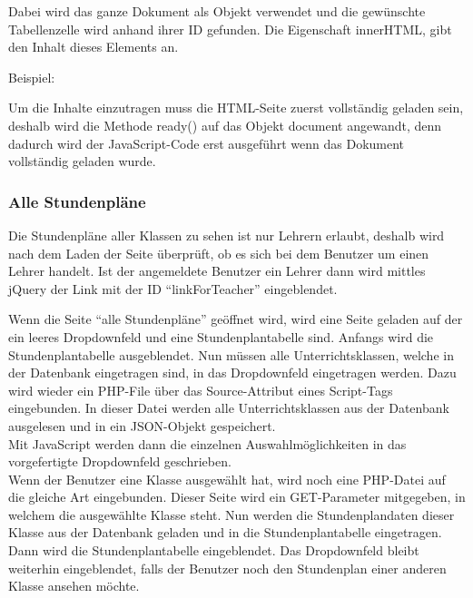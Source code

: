 Dabei wird das ganze Dokument als Objekt verwendet und die gewünschte Tabellenzelle wird anhand ihrer ID gefunden. Die Eigenschaft innerHTML, gibt den Inhalt dieses Elements an.

Beispiel:

	


Um die Inhalte einzutragen muss die HTML-Seite zuerst vollständig geladen sein, deshalb wird die Methode ready() auf das Objekt document angewandt, denn dadurch wird der JavaScript-Code erst ausgeführt wenn das Dokument vollständig geladen wurde.

\subsubsection{Alle Stundenpläne}

Die Stundenpläne aller Klassen zu sehen ist nur Lehrern erlaubt, deshalb wird nach  dem Laden der Seite überprüft, ob es sich bei dem Benutzer um einen Lehrer handelt. Ist der angemeldete Benutzer ein Lehrer dann wird mittles jQuery der Link mit der ID \enquote{linkForTeacher} eingeblendet.\\

\newpage


Wenn die Seite \enquote{alle Stundenpläne} geöffnet wird, wird eine Seite geladen auf der ein leeres Dropdownfeld und eine Stundenplantabelle sind. Anfangs wird die Stundenplantabelle ausgeblendet. Nun müssen alle Unterrichtsklassen, welche in der Datenbank eingetragen sind, in das Dropdownfeld eingetragen werden. Dazu wird wieder ein PHP-File über das Source-Attribut eines Script-Tags eingebunden. In dieser Datei werden alle Unterrichtsklassen aus der Datenbank ausgelesen und in ein JSON-Objekt gespeichert.\\
Mit JavaScript werden dann die einzelnen Auswahlmöglichkeiten in das vorgefertigte Dropdownfeld geschrieben.\\

Wenn der Benutzer eine Klasse ausgewählt hat, wird noch eine PHP-Datei auf die gleiche Art eingebunden. Dieser Seite wird ein GET-Parameter mitgegeben, in welchem die ausgewählte Klasse steht. Nun werden die Stundenplandaten dieser Klasse aus der Datenbank geladen und in die Stundenplantabelle eingetragen. Dann wird die Stundenplantabelle eingeblendet. Das Dropdownfeld bleibt weiterhin eingeblendet, falls der Benutzer noch den Stundenplan einer anderen Klasse ansehen möchte.\\

